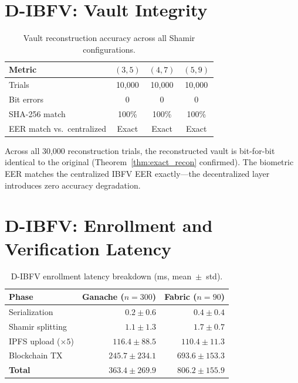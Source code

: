 \section{D-IBFV: Vault Integrity}
\label{sec:vault_integrity}

\begin{table}[h]
\centering
\caption{Vault reconstruction accuracy across all Shamir configurations.}
\label{tab:vault_integrity}
\small
\begin{tabular}{@{}l ccc@{}}
\toprule
\textbf{Metric} & $(3,5)$ & $(4,7)$ & $(5,9)$ \\
\midrule
Trials                         & 10{,}000 & 10{,}000 & 10{,}000 \\
Bit errors                     & 0       & 0       & 0       \\
SHA-256 match                  & 100\%   & 100\%   & 100\%   \\
EER match vs.\ centralized     & Exact   & Exact   & Exact   \\
\bottomrule
\end{tabular}
\end{table}

Across all 30{,}000 reconstruction trials, the reconstructed vault is bit-for-bit
identical to the original (Theorem~\ref{thm:exact_recon} confirmed). The biometric
EER matches the centralized IBFV EER exactly---the decentralized layer introduces
zero accuracy degradation.

\section{D-IBFV: Enrollment and Verification Latency}
\label{sec:dibfv_latency}

\begin{table}[h]
\centering
\caption{D-IBFV enrollment latency breakdown (ms, mean~$\pm$~std).}
\label{tab:enrollment_latency}
\small
\begin{tabular}{@{}l rr@{}}
\toprule
\textbf{Phase} & \textbf{Ganache ($n=300$)} & \textbf{Fabric ($n=90$)} \\
\midrule
Serialization            & $0.2 \pm 0.6$     & $0.4 \pm 0.4$     \\
Shamir splitting         & $1.1 \pm 1.3$     & $1.7 \pm 0.7$     \\
IPFS upload ($\times 5$) & $116.4 \pm 88.5$  & $110.4 \pm 11.3$  \\
Blockchain TX            & $245.7 \pm 234.1$ & $693.6 \pm 153.3$ \\
\midrule
\textbf{Total}           & $\mathbf{363.4 \pm 269.9}$ & $\mathbf{806.2 \pm 155.9}$ \\
\bottomrule
\end{tabular}
\end{table}

